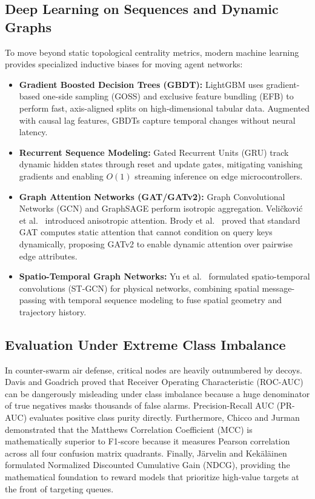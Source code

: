 \documentclass[9pt]{ieeeconf}
\begin{document}
\subsection{Deep Learning on Sequences and Dynamic Graphs}
To move beyond static topological centrality metrics, modern machine learning provides specialized inductive biases for moving agent networks:
\begin{itemize}
    \item \textbf{Gradient Boosted Decision Trees (GBDT):} LightGBM \cite{ke2017lightgbm} uses gradient-based one-side sampling (GOSS) and exclusive feature bundling (EFB) to perform fast, axis-aligned splits on high-dimensional tabular data. Augmented with causal lag features, GBDTs capture temporal changes without neural latency.
    \item \textbf{Recurrent Sequence Modeling:} Gated Recurrent Units (GRU) \cite{cho2014learning} track dynamic hidden states through reset and update gates, mitigating vanishing gradients and enabling $O(1)$ streaming inference on edge microcontrollers.
    \item \textbf{Graph Attention Networks (GAT/GATv2):} Graph Convolutional Networks (GCN) \cite{kipf2017semi} and GraphSAGE \cite{hamilton2017inductive} perform isotropic aggregation. Veli\v{c}kovi\'{c} et al.\ \cite{velickovic2018graph} introduced anisotropic attention. Brody et al.\ \cite{brody2022how} proved that standard GAT computes static attention that cannot condition on query keys dynamically, proposing GATv2 to enable dynamic attention over pairwise edge attributes.
    \item \textbf{Spatio-Temporal Graph Networks:} Yu et al.\ \cite{yu2018spatio} formulated spatio-temporal convolutions (ST-GCN) for physical networks, combining spatial message-passing with temporal sequence modeling to fuse spatial geometry and trajectory history.
\end{itemize}

\subsection{Evaluation Under Extreme Class Imbalance}
In counter-swarm air defense, critical nodes are heavily outnumbered by decoys. Davis and Goadrich \cite{davis2006relationship} proved that Receiver Operating Characteristic (ROC-AUC) can be dangerously misleading under class imbalance because a huge denominator of true negatives masks thousands of false alarms. Precision-Recall AUC (PR-AUC) evaluates positive class purity directly. Furthermore, Chicco and Jurman \cite{chicco2020advantages} demonstrated that the Matthews Correlation Coefficient (MCC) is mathematically superior to F1-score because it measures Pearson correlation across all four confusion matrix quadrants. Finally, J{\"a}rvelin and Kek{\"a}l{\"a}inen \cite{jarvelin2002cumulated} formulated Normalized Discounted Cumulative Gain (NDCG), providing the mathematical foundation to reward models that prioritize high-value targets at the front of targeting queues.
\end{document}
